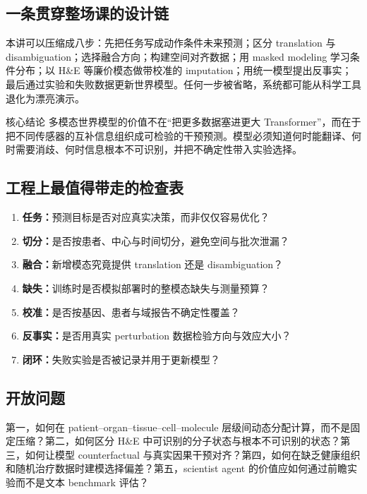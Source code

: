 \documentclass[a4paper]{article}
\begin{document}
\subsection{一条贯穿整场课的设计链}

本讲可以压缩成八步：先把任务写成动作条件未来预测；区分 translation 与 disambiguation；选择融合方向；构建空间对齐数据；用 masked modeling 学习条件分布；以 H\&E 等廉价模态做带校准的 imputation；用统一模型提出反事实；最后通过实验和失败数据更新世界模型。任何一步被省略，系统都可能从科学工具退化为漂亮演示。

\begin{importantbox}{核心结论}
多模态世界模型的价值不在“把更多数据塞进更大 Transformer”，而在于把不同传感器的互补信息组织成可检验的干预预测。模型必须知道何时能翻译、何时需要消歧、何时信息根本不可识别，并把不确定性带入实验选择。
\end{importantbox}

\subsection{工程上最值得带走的检查表}

\begin{enumerate}
  \item \textbf{任务：}预测目标是否对应真实决策，而非仅仅容易优化？
  \item \textbf{切分：}是否按患者、中心与时间切分，避免空间与批次泄漏？
  \item \textbf{融合：}新增模态究竟提供 translation 还是 disambiguation？
  \item \textbf{缺失：}训练时是否模拟部署时的整模态缺失与测量预算？
  \item \textbf{校准：}是否按基因、患者与域报告不确定性覆盖？
  \item \textbf{反事实：}是否用真实 perturbation 数据检验方向与效应大小？
  \item \textbf{闭环：}失败实验是否被记录并用于更新模型？
\end{enumerate}

\subsection{开放问题}

第一，如何在 patient--organ--tissue--cell--molecule 层级间动态分配计算，而不是固定压缩？第二，如何区分 H\&E 中可识别的分子状态与根本不可识别的状态？第三，如何让模型 counterfactual 与真实因果干预对齐？第四，如何在缺乏健康组织和随机治疗数据时建模选择偏差？第五，scientist agent 的价值应如何通过前瞻实验而不是文本 benchmark 评估？
\end{document}
